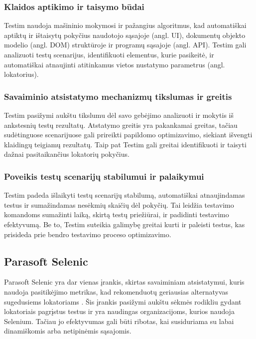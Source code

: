 \documentclass[
]{VUMIFPSkursinis}
\begin{document}
\subsubsection{Klaidos aptikimo ir taisymo būdai}

Testim naudoja mašininio mokymosi ir pažangius algoritmus, kad automatiškai aptiktų ir ištaisytų pokyčius naudotojo sąsajoje (angl. UI), dokumentų objekto modelio (angl. DOM) struktūroje ir programų sąsajoje (angl. API). Testim gali analizuoti testų scenarijus, identifikuoti elementus, kurie pasikeitė, ir automatiškai atnaujinti atitinkamus vietos nustatymo parametrus (angl. lokatorius).

\subsubsection{Savaiminio atsistatymo mechanizmų tikslumas ir greitis}

Testim pasižymi aukštu tikslumu dėl savo gebėjimo analizuoti ir mokytis iš ankstesnių testų rezultatų. Atstatymo greitis yra pakankamai greitas, tačiau sudėtinguose scenarijuose gali prireikti papildomo optimizavimo, siekiant išvengti klaidingų teigiamų rezultatų. Taip pat Testim gali greitai identifikuoti ir taisyti dažnai pasitaikančius lokatorių pokyčius.

\subsubsection{Poveikis testų scenarijų stabilumui ir palaikymui}

Testim padeda išlaikyti testų scenarijų stabilumą, automatiškai atnaujindamas testus ir sumažindamas nesėkmių skaičių dėl pokyčių. Tai leidžia testavimo komandoms sumažinti laiką, skirtą testų priežiūrai, ir padidinti testavimo efektyvumą. Be to, Testim suteikia galimybę greitai kurti ir paleisti testus, kas prisideda prie bendro testavimo proceso optimizavimo.

\subsection{Parasoft Selenic}
Parasoft Selenic yra dar vienas įrankis, skirtas savaiminiam atsistatymui, kuris naudoja pasitikėjimo metrikas, kad rekomenduotų geriausias alternatyvas sugedusiems lokatoriams \cite{Garousi2024}. Šis įrankis pasižymi aukštu sėkmės rodikliu gydant lokatoriais pagrįstus testus ir yra naudingas organizacijoms, kurios naudoja Selenium. Tačiau jo efektyvumas gali būti ribotas, kai susiduriama su labai dinamiškomis arba netipinėmis sąsajomis. \cite{Selenic}
\end{document}
